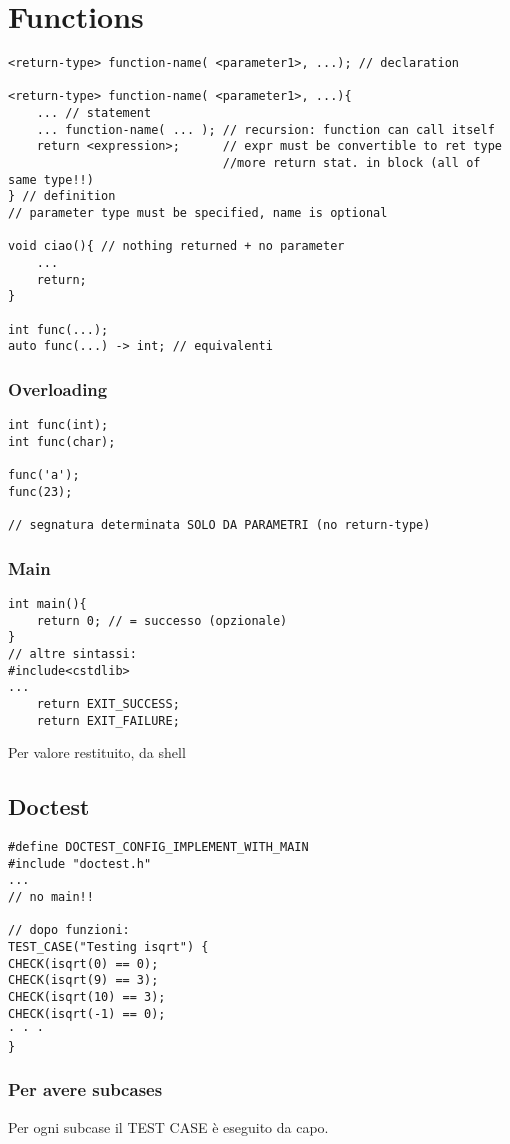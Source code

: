 \documentclass[10pt, oneside]{Book}
\begin{document}
\chapter{Functions}
\begin{verbatim}
<return-type> function-name( <parameter1>, ...); // declaration

<return-type> function-name( <parameter1>, ...){
    ... // statement
    ... function-name( ... ); // recursion: function can call itself
    return <expression>;      // expr must be convertible to ret type
                              //more return stat. in block (all of same type!!)
} // definition
// parameter type must be specified, name is optional

void ciao(){ // nothing returned + no parameter
    ...
    return;
}

int func(...);
auto func(...) -> int; // equivalenti
\end{verbatim}
\subsection{Overloading}
\begin{verbatim}
int func(int);
int func(char);

func('a');
func(23);

// segnatura determinata SOLO DA PARAMETRI (no return-type)
\end{verbatim}

\subsection{Main}
\begin{verbatim}
int main(){
	return 0; // = successo (opzionale)
}
// altre sintassi: 
#include<cstdlib>
...
    return EXIT_SUCCESS; 
    return EXIT_FAILURE;
\end{verbatim}
Per valore restituito, da shell 

\section{Doctest}
\begin{verbatim}
#define DOCTEST_CONFIG_IMPLEMENT_WITH_MAIN
#include "doctest.h"
...
// no main!!

// dopo funzioni:
TEST_CASE("Testing isqrt") {
CHECK(isqrt(0) == 0);
CHECK(isqrt(9) == 3);
CHECK(isqrt(10) == 3);
CHECK(isqrt(-1) == 0);
· · ·
}
\end{verbatim}
\subsection{Per avere subcases}
Per ogni subcase il TEST CASE è eseguito da capo.
\end{document}
